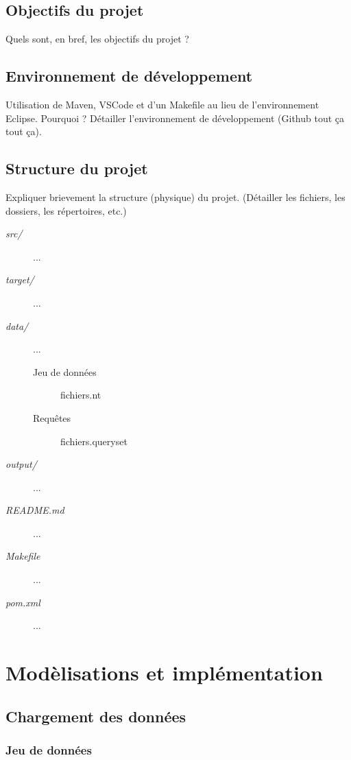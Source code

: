 \documentclass[12pt,titlepage]{article}
\begin{document}
\subsection*{Objectifs du projet}

Quels sont, en bref, les objectifs du projet ?

\subsection*{Environnement de développement}

Utilisation de Maven, VSCode et d'un Makefile au lieu de l'environnement Eclipse. Pourquoi ?
Détailler l'environnement de développement (Github tout ça tout ça).

\subsection*{Structure du projet}

Expliquer brievement la structure (physique) du projet. (Détailler les fichiers, les dossiers, les répertoires, etc.)

\begin{description}
	\item[\textit{src/}] ...
	\item[\textit{target/}] ...
	\item[\textit{data/}] ...
	\begin{description}
		\item[Jeu de données] fichiers.nt
		\item[Requêtes] fichiers.queryset
	\end{description}
		\item[\textit{output/}] ...	
		\item[\textit{README.md}] ...
		\item[\textit{Makefile}] ...
		\item[\textit{pom.xml}] ...
\end{description}

\section{Modèlisations et implémentation}

\subsection{Chargement des données}

\subsubsection{Jeu de données}
\end{document}
